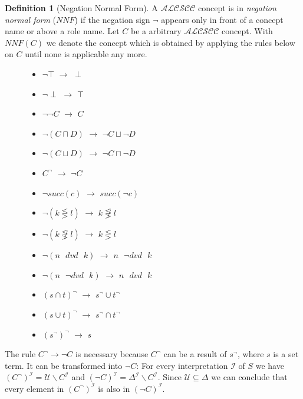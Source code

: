 \documentclass[a4paper,11pt]{scrartcl}
\theoremstyle{break}
\theoremstyle{definition}
\newtheorem{mydef}{Definition}
\begin{document}
\begin{mydef}[Negation Normal Form]
A $\mathcal{ALCSCC}$ concept is in \textit{negation normal form} ($NNF$) if the negation sign $\neg$ appears only in front of a concept name or above a role name. Let $C$ be a arbitrary $\mathcal{ALCSCC}$ concept. With $NNF(C)$ we denote the concept which is obtained by applying the rules below on $C$ until none is applicable any more.
\begin{figure}[H]
\begin{minipage}[t]{.5\textwidth}
\raggedright
\begin{itemize}
\item $\neg\top$ $\rightarrow$ $\perp$
\item $\neg\perp$ $\rightarrow$ $\top$
\item $\neg\neg C$ $\rightarrow$ $C$
\item $\neg(C\sqcap D)$ $\rightarrow$ $\neg C \sqcup \neg D$
\item $\neg(C\sqcup D)$ $\rightarrow$ $\neg C \sqcap \neg D$
\item $C^\neg$ $\rightarrow$ $\neg C$
\item $\neg succ(c)$ $\rightarrow$ $succ(\neg c)$
\end{itemize}
\end{minipage}%
\begin{minipage}[t]{.5\textwidth}
\raggedleft
\begin{itemize}
\item $\neg (k\lesseqgtr l)$ $\rightarrow$ $k\not\lesseqgtr l$
\item $\neg (k\not\lesseqgtr l)$ $\rightarrow$ $k\lesseqgtr l$
\item $\neg (n\text{ } dvd \text{ } k)$ $\rightarrow$ $n\text{ } \neg dvd \text{ } k$
\item $\neg (n\text{ } \neg dvd \text{ } k)$ $\rightarrow$ $n\text{ } dvd \text{ } k$
\item $(s\cap t)^\neg$ $\rightarrow$ $s^\neg \cup t^\neg$
\item $(s\cup t)^\neg$ $\rightarrow$ $s^\neg \cap t^\neg$
\item $(s^\neg)^\neg$ $\rightarrow$ $s$
\end{itemize}
\end{minipage}
\end{figure}
\end{mydef}
The rule $C^\neg\rightarrow \neg C$ is necessary because $C^\neg$ can be a result of $s^\neg$, where $s$ is a set term. It can be transformed into $\neg C$: For every interpretation $\mathcal{I}$ of $S$ we have $(C^\neg)^\mathcal{I}=\mathcal{U}\backslash C^\mathcal{I}$ and $(\neg C)^\mathcal{I}=\Delta^\mathcal{I}\backslash C^\mathcal{I}$. Since $\mathcal{U}\subseteq \Delta$ we can conclude that every element in $(C^\neg)^\mathcal{I}$ is also in $(\neg C)^\mathcal{I}$.
\end{document}
